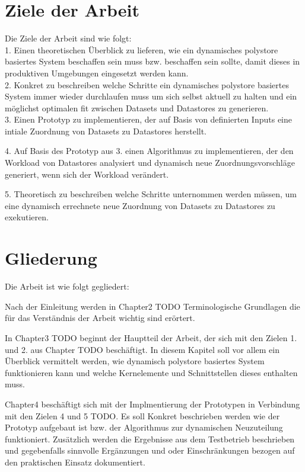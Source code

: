 %
%
\section{Ziele der Arbeit}
\label{sec:intro:goal}
Die Ziele der Arbeit sind wie folgt: \\

1. Einen theoretischen Überblick zu lieferen, wie ein dynamisches polystore basiertes System beschaffen 
sein muss bzw. beschaffen sein sollte, damit dieses in produktiven Umgebungen eingesetzt werden  kann.
\\

2. Konkret zu beschreiben welche Schritte ein dynamisches polystore basiertes System immer wieder durchlaufen 
muss um sich selbst aktuell zu halten und ein möglichst optimalen fit zwischen Datasets und Datastores
zu generieren.
\\
3. Einen Prototyp zu implementieren, der auf Basis von definierten Inputs eine intiale Zuordnung von 
Datasets zu Datastores herstellt. 

4. Auf Basis des Prototyp aus 3. einen Algorithmus zu implementieren, der den Workload von Datastores
analysiert und dynamisch neue Zuordnungsvorschläge generiert, wenn sich der Workload verändert.

5. Theoretisch zu beschreiben welche Schritte unternommen werden müssen, um eine dynamisch errechnete
neue Zuordnung von Datasets zu Datastores zu exekutieren.

%
\section{Gliederung}
\label{sec:intro:structure}

Die Arbeit ist wie folgt gegliedert:

Nach der Einleitung werden in Chapter2 TODO Terminologische Grundlagen die für das Verständnis
der Arbeit wichtig sind erörtert.

In Chapter3 TODO beginnt der Hauptteil der Arbeit, der sich mit den Zielen 1. und 2. aus Chapter TODO 
beschäftigt. In diesem Kapitel soll vor allem ein Überblick vermittelt werden, wie 
dynamisch polystore basiertes System funktionieren kann und welche Kernelemente und Schnittstellen 
dieses enthalten muss.

Chapter4 beschäftigt sich mit der Implmentierung der Prototypen in Verbindung mit den Zielen 4 und 5 TODO.
Es soll Konkret beschrieben werden wie der Prototyp aufgebaut ist bzw. der Algorithmus zur 
dynamischen Neuzuteilung funktioniert. Zusätzlich werden die Ergebnisse aus dem Testbetrieb beschrieben
und gegebenfalls sinnvolle Ergänzungen und oder Einschränkungen bezogen auf den praktischen Einsatz 
dokumentiert.

